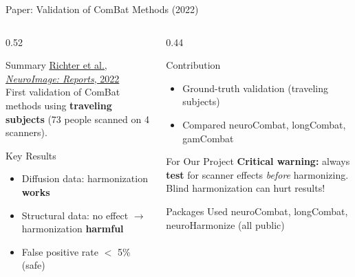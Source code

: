 \documentclass[aspectratio=169,xcolor=dvipsnames]{beamer}
\begin{document}
\begin{frame}{Paper: Validation of ComBat Methods (2022)}
    \begin{columns}
        \begin{column}{0.52\textwidth}
            \begin{block}{Summary}
                \small
                \href{https://doi.org/10.1016/j.ynirp.2022.100136}{Richter et al., \textit{NeuroImage: Reports}, 2022}\\[0.3em]
                First validation of ComBat methods using \textbf{traveling subjects} (73 people scanned on 4 scanners).
            \end{block}

            \vspace{0.2em}

            \begin{block}{Key Results}
                \small
                \begin{itemize}
                    \item Diffusion data: harmonization \textbf{works} \textcolor{green}{}
                    \item Structural data: no effect $\to$ harmonization \textbf{harmful} \textcolor{red}{}
                    \item False positive rate $<$ 5\% (safe)
                \end{itemize}
            \end{block}
        \end{column}

        \begin{column}{0.44\textwidth}
            \begin{block}{Contribution}
                \small
                \begin{itemize}
                    \item Ground-truth validation (traveling subjects)
                    \item Compared neuroCombat, longCombat, gamCombat
                \end{itemize}
            \end{block}

            \vspace{0.2em}

            \begin{alertblock}{For Our Project}
                \small
                \textbf{Critical warning:} always \textbf{test} for scanner effects \textit{before} harmonizing. Blind harmonization can hurt results!
            \end{alertblock}

            \begin{exampleblock}{\scriptsize {} Packages Used}
                \scriptsize neuroCombat, longCombat, neuroHarmonize (all public)
            \end{exampleblock}
        \end{column}
    \end{columns}
\end{frame}
\end{document}
